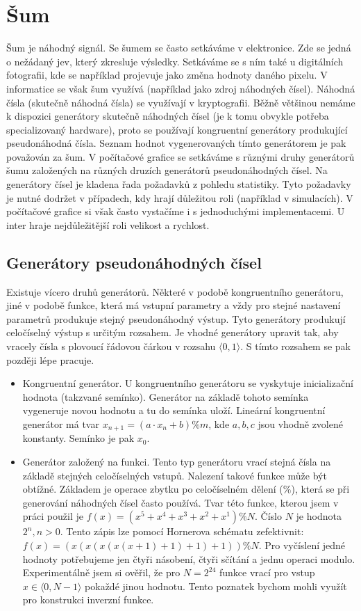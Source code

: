 
\section{Šum}\label{sec:sum}
Šum je náhodný signál.
Se šumem se často setkáváme v elektronice.
Zde se jedná o nežádaný jev, který zkresluje výsledky.
Setkáváme se s ním také u digitálních fotografii, kde se například projevuje jako změna hodnoty daného pixelu.
V informatice se však šum využívá (například jako zdroj náhodných čísel).
Náhodná čísla (skutečně náhodná čísla) se využívají v kryptografii.
Běžně většinou nemáme k dispozici generátory skutečně náhodných čísel (je k tomu obvykle potřeba specializovaný hardware), proto se používají kongruentní generátory produkující pseudonáhodná čísla.
Seznam hodnot vygenerovaných tímto generátorem je pak považován za šum.
V počítačové grafice se setkáváme s různými druhy generátorů šumu založených na různých druzích generátorů pseudonáhodných čísel.
Na generátory čísel je kladena řada požadavků z pohledu statistiky.
Tyto požadavky je nutné dodržet v případech, kdy hrají důležitou roli (například v simulacích).
V počítačové grafice si však často vystačíme i s jednoduchými implementacemi.
U inter hraje nejdůležitější roli velikost a rychlost.

\subsection{Generátory pseudonáhodných čísel}
Existuje vícero druhů generátorů.
Některé v podobě kongruentního generátoru, jiné v podobě funkce, která má vstupní parametry a vždy pro stejné nastavení parametrů produkuje stejný pseudonáhodný výstup.
Tyto generátory produkují celočíselný výstup s ur\-či\-tým rozsahem.
Je vhodné generátory upravit tak, aby vracely čísla s plovoucí řádovou čárkou v rozsahu $\langle 0,1 \rangle$.
S tímto rozsahem se pak později lépe pracuje.
\begin{itemize}
\item
Kongruentní generátor.
U kongruentního generátoru se vyskytuje inicializační hodnota (takzvané semínko).
Generátor na základě tohoto semínka vygeneruje novou hodnotu a tu do semínka uloží.
Lineární kongruentní generátor má tvar $x_{n+1}=(a \cdot x_n+b) \% m$, kde $a,b,c$ jsou vhodně zvolené konstanty.
Semínko je pak $x_0$.

\item
Generátor založený na funkci.
Tento typ generátoru vrací stejná čísla na základě stejných celočíselných vstupů.
Nalezení takové funkce může být obtížné.
Základem je operace zbytku po celočíselném dělení ($\%$), která se při generování náhodných čísel často používá.
Tvar této funkce, kterou jsem v práci použil je $f(x)=(x^5+x^4+x^3+x^2+x^1) \% N$.
Číslo $N$ je hodnota $2^n,n>0$.
Tento zápis lze pomocí Hornerova schématu zefektivnit: $f(x)=(x(x(x(x(x+1)+1)+1)+1)) \% N $.
Pro vyčíslení jedné hodnoty potřebujeme jen čtyři násobení, čtyři sčítání a jednu operaci modulo.
Experimentálně jsem si ověřil, že pro $N=2^{24}$ funkce vrací pro vstup $x \in \langle 0,N-1 \rangle$ pokaždé jinou hodnotu.
Tento poznatek bychom mohli využít pro konstrukci inverzní funkce.
\end{itemize}

